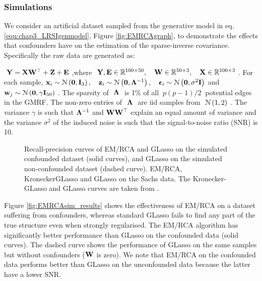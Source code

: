     \subsubsection{Simulations} \label{subsec:chap5_simulation}

      We consider an artificial dataset sampled from the generative model in eq. \eqref{equ:chap3_LRSIgenmodel}, Figure \ref{fig:EMRCAgraph}, to demonstrate the effects that confounders have on the estimation of the sparse-inverse covariance. Specifically the raw data are generated as:
      
      $~\mathbf{Y} = \mathbf{X}\mathbf{W}^\top + \mathbf{Z} + \mathbf{E}~$,\quad where \quad $~\mathbf{Y},\mathbf{E} \in \mathbb{R}^{100 \times 50}, \quad \mathbf{W} \in \mathbb{R}^{50 \times 3}, \quad \mathbf{X} \in \mathbb{R}^{100 \times 3}~$. For each sample, \quad $\mathbf{x}_i \sim \mathcal{N} \left( \mathbf{0}, \mathbf{I}_3 \right), \quad \mathbf{z}_i \sim \mathcal{N} \left( \mathbf{0}, \mathbf{\Lambda}^{-1} \right), \quad \boldsymbol{\epsilon}_i \sim \mathcal{N} \left( \mathbf{0}, \sigma^2\mathbf{I} \right)$ \quad and \quad $\mathbf{w}_j \sim \mathcal{N} \left( \mathbf{0}, \gamma\mathbf{I}_{50} \right)~$. The sparsity of $~\mathbf{\Lambda}~$ is 1\% of all $~p(p-1)/2~$ potential edges in the GMRF. The non-zero entries of $~\mathbf{\Lambda}~$ are iid samples from $~\mathcal{N} \left( 1, 2 \right)~$. The variance $\gamma$ is such that $\mathbf{\Lambda}^{-1}$ and $\mathbf{W}\mathbf{W}^\top$ explain an equal amount of variance and the variance $\sigma^2$ of the induced noise is such that the signal-to-noise ratio (SNR) is 10.
      \begin{figure}[!htbp]
	\centering
	\hfill
	\caption[Results on simulations with a low-rank plus sparse-inverse covariance.]{
	   Recall-precision curves of EM/RCA and GLasso on the simulated confounded dataset (solid curves), and GLasso on the simulated non-confounded dataset (dashed curve).  EM/RCA, KroneckerGLasso and GLasso on the Sachs data. The Kronecker-GLasso and GLasso curves are taken from \citep{stegle:efficient11}.
	}
	\label{fig:EMRCAsimdata}
      \end{figure}
      Figure \ref{fig:EMRCAsim_results} shows the effectiveness of EM/RCA on a dataset suffering from confounders, whereas standard GLasso fails to find any part of the true structure even when strongly regularised. The EM/RCA algorithm has significantly better performance than GLasso on the confounded data (solid curves). The dashed curve shows the performance of GLasso on the same samples but without confounders ($\mathbf{W}$ is zero). We note that EM/RCA on the confounded data performs better than GLasso on the unconfounded data because the latter have a lower SNR.


